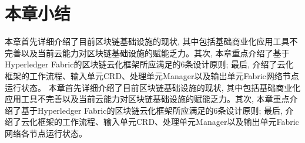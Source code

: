\section{本章小结}

本章首先详细介绍了目前区块链基础设施的现状, 其中包括基础商业化应用工具不完善以及当前云能力对区块链基础设施的赋能乏力。其次, 本章重点介绍了基于Hyperledger Fabric的区块链云化框架所应满足的6条设计原则; 最后, 介绍了云化框架的工作流程、输入单元CRD、处理单元Manager以及输出单元Fabric网络节点运行状态。
本章首先详细介绍了目前区块链基础设施的现状, 其中包括基础商业化应用工具不完善以及当前云能力对区块链基础设施的赋能乏力。其次, 本章重点介绍了基于Hyperledger Fabric的区块链云化框架所应满足的6条设计原则; 最后, 介绍了云化框架的工作流程、输入单元CRD、处理单元Manager以及输出单元Fabric网络各节点运行状态。